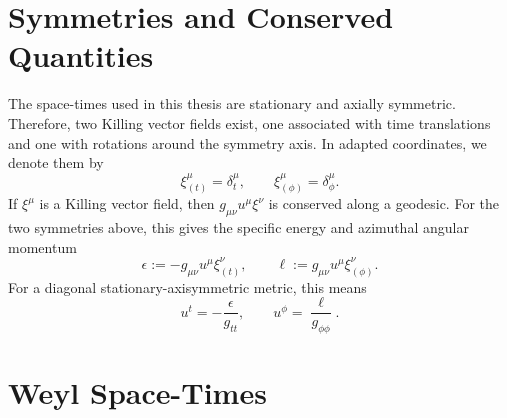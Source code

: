 \section{Symmetries and Conserved Quantities}
\label{sec:symmetries-conserved-quantities}

The space-times used in this thesis are stationary and axially symmetric. Therefore, two Killing vector fields exist, one associated with time
translations and one with rotations around the symmetry axis. In adapted
coordinates, we denote them by
\begin{equation}
    \xi^\mu_{(t)}=\delta^\mu_t,
    \qquad
    \xi^\mu_{(\phi)}=\delta^\mu_\phi .
    \label{eq:killings}
\end{equation}
If \(\xi^\mu\) is a Killing vector field, then
\(g_{\mu\nu}u^\mu\xi^\nu\) is conserved along a geodesic. For the two
symmetries above, this gives the specific energy and azimuthal angular momentum
\begin{equation}
    \epsilon
    :=
    -g_{\mu\nu}u^\mu\xi^\nu_{(t)},
    \qquad
    \ell
    :=
    g_{\mu\nu}u^\mu\xi^\nu_{(\phi)}.
    \label{eq:conservation}
\end{equation}
For a diagonal stationary-axisymmetric metric, this means
\begin{equation}
    u^t=-\frac{\epsilon}{g_{tt}},
    \qquad
    u^\phi=\frac{\ell}{g_{\phi\phi}}.
    \label{eq:ut-uphi-conserved}
\end{equation}

\section{Weyl Space-Times}
\label{sec:weyl-space-times}

